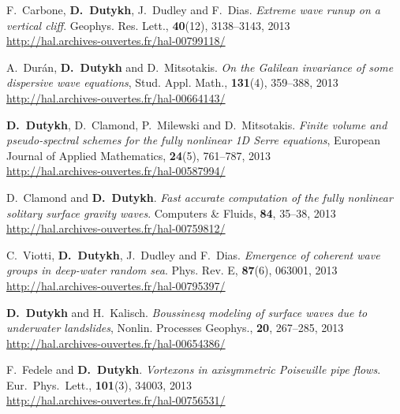 \begin{etaremune}
  \item F.~Carbone, \textbf{D.~Dutykh}, J.~Dudley and F.~Dias. \textit{Extreme wave runup on a vertical cliff}. Geophys. Res. Lett., \textbf{40}(12), 3138--3143, 2013 \\ %
  \url{http://hal.archives-ouvertes.fr/hal-00799118/}

  \item A.~Dur\'an, \textbf{D.~Dutykh} and D.~Mitsotakis. \textit{On the Galilean invariance of some dispersive wave equations}, Stud. Appl. Math., \textbf{131}(4), 359--388, 2013 \\ %
  \url{http://hal.archives-ouvertes.fr/hal-00664143/}

  \item \textbf{D.~Dutykh}, D.~Clamond, P.~Milewski and D.~Mitsotakis. \textit{Finite volume and pseudo-spectral schemes for the fully nonlinear 1D Serre equations}, European Journal of Applied Mathematics, \textbf{24}(5), 761--787, 2013 \\ %
  \url{http://hal.archives-ouvertes.fr/hal-00587994/}
  
  \item D.~Clamond and \textbf{D.~Dutykh}. \textit{Fast accurate computation of the fully nonlinear solitary surface gravity waves}. Computers \& Fluids, \textbf{84}, 35--38, 2013 \\ %
  \url{http://hal.archives-ouvertes.fr/hal-00759812/}
  
  \item C.~Viotti, \textbf{D.~Dutykh}, J.~Dudley and F.~Dias. \textit{Emergence of coherent wave groups in deep-water random sea}. Phys. Rev. E, \textbf{87}(6), 063001, 2013 \\ %
  \url{http://hal.archives-ouvertes.fr/hal-00795397/}
  
  \item \textbf{D.~Dutykh} and H.~Kalisch. \textit{Boussinesq modeling of surface waves due to underwater landslides}, Nonlin. Processes Geophys., \textbf{20}, 267--285, 2013 \\ %
  \url{http://hal.archives-ouvertes.fr/hal-00654386/}

  \item F.~Fedele and \textbf{D.~Dutykh}. \textit{Vortexons in axisymmetric Poiseuille pipe flows}. Eur.~Phys.~Lett., \textbf{101}(3), 34003, 2013 \\ %
  \url{http://hal.archives-ouvertes.fr/hal-00756531/}
  

\end{etaremune}
